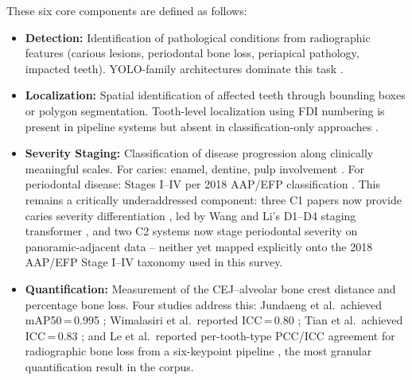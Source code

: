 \documentclass[conference]{IEEEtran}
\begin{document}
These six core components are defined as follows:

\begin{itemize}
    \item \textbf{Detection:} Identification of pathological conditions
          from radiographic features (carious lesions, periodontal bone
          loss, periapical pathology, impacted teeth). YOLO-family
          architectures dominate this task
          \cite{ayhan2025detection,nassiri2025yolo,chen2024cariesxrays,
          bizjak2024advancing,pornprasertsuk2025clinical}.

    \item \textbf{Localization:} Spatial identification of affected
          teeth through bounding boxes or polygon segmentation.
          Tooth-level localization using FDI numbering is present in
          pipeline systems
          \cite{jundaeng2025advanced,chen2024cariesxrays,bizjak2024advancing,
          pornprasertsuk2025clinical} but absent in
          classification-only approaches
          \cite{kaushik2025densenet201,mathur2025comparative,ozdemir2026enhanced}.

    \item \textbf{Severity Staging:} Classification of disease
          progression along clinically meaningful scales. For caries:
          enamel, dentine, pulp involvement
          \cite{asadi2024detection,bizjak2024advancing}. For
          periodontal disease: Stages I--IV per 2018 AAP/EFP
          classification \cite{chmielewski20252018}. This remains a
          critically underaddressed component: three C1 papers now
          provide caries severity differentiation
          \cite{bizjak2024advancing,asadi2024detection,wang2026transformer},
          led by Wang and Li's D1--D4 staging transformer
          \cite{wang2026transformer}, and two C2 systems now stage
          periodontal severity on panoramic-adjacent data
          \cite{le2026automated,li2025novel} -- neither yet mapped
          explicitly onto the 2018 AAP/EFP Stage I--IV taxonomy used in
          this survey.

    \item \textbf{Quantification:} Measurement of the CEJ--alveolar
          bone crest distance and percentage bone loss. Four studies
          address this: Jundaeng et al.\ achieved
          mAP50\,=\,0.995 \cite{jundaeng2025advanced}; Wimalasiri et
          al.\ reported ICC\,=\,0.80 \cite{wimalasiri2025ai}; Tian
          et al.\ achieved ICC\,=\,0.83 \cite{tian2025development}; and
          Le et al.\ reported per-tooth-type PCC/ICC agreement for
          radiographic bone loss from a six-keypoint pipeline
          \cite{le2026automated}, the most granular quantification
          result in the corpus.


\end{itemize}
\end{document}
